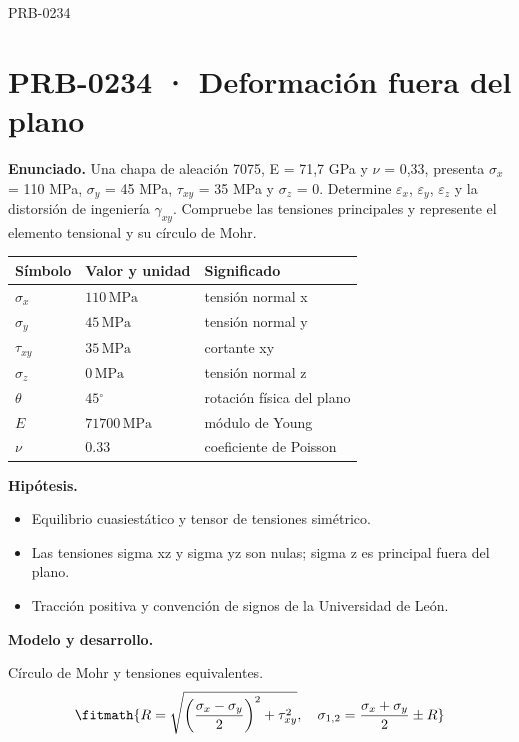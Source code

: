 \begin{studiumworked}{PRB-0234}

\section{PRB-0234 · Deformación fuera del plano}

\textbf{Enunciado.} Una chapa de aleación 7075, E = 71,7 GPa y $\nu$ = 0,33, presenta $\sigma_x$ = 110 MPa, $\sigma_y$ = 45 MPa, $\tau_{xy}$ = 35 MPa y $\sigma_z$ = 0. Determine $\varepsilon_x$, $\varepsilon_y$, $\varepsilon_z$ y la distorsión de ingeniería $\gamma_{xy}$. Compruebe las tensiones principales y represente el elemento tensional y su círculo de Mohr.

\par\medskip\noindent\begin{tabular}{@{}p{.18\linewidth}p{.26\linewidth}p{.48\linewidth}@{}}
\toprule Símbolo & Valor y unidad & Significado\\\midrule
$\sigma_{x}$ & $110\,\mathrm{MPa}$ & tensión normal x\\
$\sigma_{y}$ & $45\,\mathrm{MPa}$ & tensión normal y\\
$\tau_{xy}$ & $35\,\mathrm{MPa}$ & cortante xy\\
$\sigma_{z}$ & $0\,\mathrm{MPa}$ & tensión normal z\\
$\theta$ & $45{}^{\circ}$ & rotación física del plano\\
$E$ & $71700\,\mathrm{MPa}$ & módulo de Young\\
$\nu$ & $0.33$ & coeficiente de Poisson\\
\bottomrule\end{tabular}\par\medskip

\textbf{Hipótesis.}\begin{itemize}\item Equilibrio cuasiestático y tensor de tensiones simétrico.
\item Las tensiones sigma xz y sigma yz son nulas; sigma z es principal fuera del plano.
\item Tracción positiva y convención de signos de la Universidad de León.\end{itemize}

\textbf{Modelo y desarrollo.}

Círculo de Mohr y tensiones equivalentes.\[\fitmath{R=\sqrt{\left(\frac{\sigma_x-\sigma_y}{2}\right)^2+\tau_{xy}^{2}},\quad\sigma_{1,2}=\frac{\sigma_x+\sigma_y}{2}\pm R}\]


\end{studiumworked}
